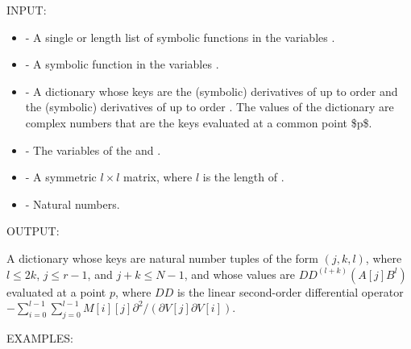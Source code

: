 \documentclass[letterpaper,12pt,openany,oneside]{sphinxmanual}
\begin{document}
\begin{fulllineitems}
\begin{fulllineitems}
INPUT:
\begin{itemize}
\item {} 
 - A single or length  list of symbolic functions in the
variables .

\item {} 
 - A symbolic function in the variables .

\item {} 
 - A dictionary whose keys are the (symbolic)
derivatives of  up to order  and
the (symbolic) derivatives of  up to order .
The values of the dictionary are complex numbers that are
the keys evaluated at a common point \$p\$.

\item {} 
 - The variables of the  and .

\item {} 
 - A symmetric $l \times l$ matrix, where $l$ is the
length of .

\item {} 
 - Natural numbers.

\end{itemize}

OUTPUT:

A dictionary whose keys are natural number tuples of the form
$(j, k, l)$, where $l \le 2k$, $j \le r-1$, and $j+k \le N-1$,
and whose values are $DD^(l+k)(A[j] B^l)$ evaluated at a point
$p$, where $DD$ is the linear second-order differential operator
$-\sum_{i=0}^{l-1} \sum_{j=0}^{l-1} M[i][j]
\partial^2 /(\partial V[j] \partial V[i])$.

EXAMPLES:


\end{fulllineitems}
\end{fulllineitems}
\end{document}
